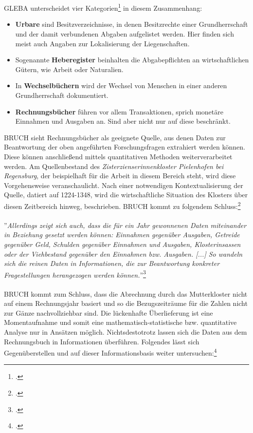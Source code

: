 \documentclass[12pt,a4paper]{article}
\begin{document}
\\
\\
GLEBA unterscheidet vier Kategorien\footcite[][S.51--54]{gleba2016rechnen} in diesem Zusammenhang:
\begin{itemize}
\item \textbf{Urbare} sind Besitzverzeichnisse, in denen Besitzrechte einer Grundherrschaft und der damit verbundenen Abgaben aufgelistet werden. Hier finden sich meist auch Angaben zur Lokalisierung der Liegenschaften.
\item Sogenannte \textbf{Heberegister} beinhalten die Abgabepflichten an wirtschaftlichen Gütern, wie Arbeit oder Naturalien.
\item In \textbf{Wechselbüchern} wird der Wechsel von Menschen in einer anderen Grundherrschaft dokumentiert. 
\item \textbf{Rechnungsbücher} führen vor allem Transaktionen, sprich monetäre Einnahmen und Ausgaben an. Sind aber nicht nur auf diese beschränkt.
\end{itemize}
BRUCH sieht Rechnungsbücher als geeignete Quelle, aus denen Daten zur Beantwortung der oben angeführten Forschungsfragen extrahiert werden können. Diese können anschließend mittels quantitativen Methoden weiterverarbeitet werden. Am Quellenbestand des \textit{Zisterzienserinnenkloster Pielenhofen bei Regensburg}, der beispielhaft für die Arbeit in diesem Bereich steht, wird diese Vorgehensweise veranschaulicht. Nach einer notwendigen Kontextualisierung der Quelle, datiert auf 1224-1348, wird die wirtschaftliche Situation des Klosters über diesen Zeitbereich hinweg, beschrieben. BRUCH kommt zu folgendem Schluss:\footcite[][S.13-37]{bruch2015daten}
\\
\\
''\textit{Allerdings zeigt sich auch, dass die für ein Jahr gewonnenen Daten miteinander in Beziehung gesetzt werden können: Einnahmen gegenüber Ausgaben, Getreide gegenüber Geld, Schulden gegenüber Einnahmen und Ausgaben, Klosterinsassen oder der Viehbestand gegenüber den Einnahmen bzw. Ausgaben. [...] So wandeln sich die reinen Daten in Informationen, die zur Beantwortung konkreter Fragestellungen herangezogen werden können.}''\footcite[][S.37]{bruch2015daten}
\\
\\
BRUCH kommt zum Schluss, dass die Abrechnung durch das Mutterkloster nicht auf einem Rechnungsjahr basiert und so die Bezugszeiträume für die Zahlen nicht zur Gänze nachvollziehbar sind. Die lückenhafte Überlieferung ist eine Momentaufnahme und somit eine mathematisch-statistische bzw. quantitative Analyse nur in Ansätzen möglich. Nichtsdestotrotz lassen sich die Daten aus dem Rechnungsbuch in Informationen überführen. Folgendes lässt sich Gegenüberstellen und auf dieser Informationsbasis weiter untersuchen:\footcite[][S.37-44]{bruch2015daten}
\end{document}
